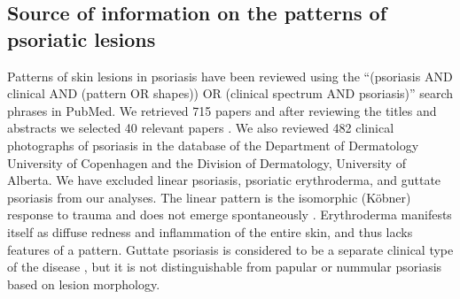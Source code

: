 \subsection{Source of information on the patterns of psoriatic lesions}
Patterns of skin lesions in psoriasis have been reviewed using the “(psoriasis AND clinical AND (pattern OR shapes)) OR (clinical spectrum AND psoriasis)” search phrases in PubMed. We retrieved 715 papers and after reviewing the titles and abstracts we selected 40 relevant papers \citep{ayala2007, baker1971, balato2009, beylot1979, buxton1987, champion1986, chau2017, christophers2001, cordoro2008, dimeglio2014, fernandes2011, gropper2001, hernandez2017, hodge1977, jablonska2000, kumar1995, lal1966, lebwohl2003, magro1997, meier2009, melski1983, menter1991, gopal2013, mitchell1962, morris2001, naldi2007, de2010, picciani2017, rasmussen1986, raychaudhuri2014, reich2009, saleh2018, schon2005, seneschal2012, stankier1974, stern1997, talwar1995, whyte1964, wollenberg2011, ziemer2009}. We also reviewed 482 clinical photographs of psoriasis in the database of the Department of Dermatology University of Copenhagen and the Division of Dermatology, University of Alberta. We have excluded linear psoriasis, psoriatic erythroderma, and guttate psoriasis from our analyses. The linear pattern is the isomorphic (Köbner) response to trauma and does not emerge spontaneously \citep{melski1983}. Erythroderma manifests itself as diffuse redness and inflammation of the entire skin, and thus lacks features of a pattern. Guttate psoriasis is considered to be a separate clinical type of the disease \citep{rasmussen1986, raychaudhuri2014, whyte1964}, but it is not distinguishable from papular or nummular psoriasis based on lesion morphology. 

